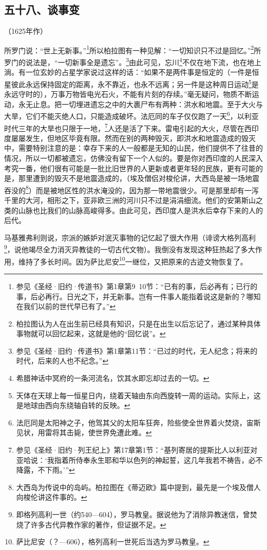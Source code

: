 \subsection*{五十八、谈事变}


\begin{center}
    （1625年作）
\end{center}

\par 所罗门说：“世上无新事。”\footnote{参见《圣经·旧约·传道书》第1章第9~10节：“已有的事，后必再有；已行的事，后必再行。日光之下，并无新事。岂有一件事人能指着说这是新的？哪知在我们以前的世代早已有了。”}所以柏拉图有一种见解：“一切知识只不过是回忆。”\footnote{柏拉图认为人在出生前已经具有知识，只是在出生以后忘记了，通过某种具体事物就可以回忆起来，这就是他的“回忆说”。}所罗门的说法是，“一切新事全是遗忘”。\footnote{参见《圣经·旧约·传道书》第1章第11节：“已过的时代，无人纪念；将来的时代，后来的人也不纪念。”}由此可见，忘川\footnote{希腊神话中冥府的一条河流名，饮其水即忘却过去的一切。}不仅在地下流，也在地上淌。有一位玄妙的占星学家说过这样的话：“如果不是两件事是恒定的（一件是恒星彼此永远保持固定的距离，永不靠近，也永不远离；另一件是这种周日运动\footnote{天体在天球上每一恒星日内，绕着天轴由东向西旋转一周的运动。实际上，这是地球由西向东绕轴自转的反映。}是永远守时的），万事万物皆电光石火，不能有片刻的存续。”毫无疑问，物质不断运动，永无止息。把一切埋进遗忘之中的大裹尸布有两种：洪水和地震。至于大火与大旱，它们不能灭绝人口，只能造成破坏。法厄同的车子仅仅跑了一天\footnote{法厄同是太阳神之子，他驾其父的太阳车狂奔，险些使全世界着火焚烧，宙斯见状，用雷将其击毙，使世界免遭此难。}，以利亚时代三年的大旱也只限于一地，\footnote{参见《圣经·旧约·列王纪上》第17章第1节：“基列寄居的提斯比人以利亚对亚哈说：‘我指着所侍奉永生耶和华以色列的神起誓，这几年我若不祷告，必不降露，不下雨。’”}人还是活了下来。雷电引起的大火，尽管在西印度屡屡发生，但地区毕竟有限。然而在别的两种毁灭，即洪水和地震造成的毁灭中，需要特别注意的是：幸存下来的人一般都是无知的山民，他们提供不了往昔的情况，所以一切都被遗忘，仿佛没有留下一个人似的。要是你对西印度的人民深入考究一番，他们很有可能是一批比旧世界的人更新或者更年轻的民族，更有可能的是，那里遭到的毁灭不是地震造成的，（埃及僧侣对梭伦讲，大西岛是被一场地震吞没的\footnote{大西岛为传说中的岛屿。柏拉图在《蒂迈欧》篇中提到，最先是一个埃及僧人向梭伦讲这件事的。}）而是被地区性的洪水淹没的，因为那一带地震很少。可是那里却有一泻千里的大河，相形之下，亚非欧三洲的河川只不过是涓涓细流。他们的安第斯山之类的山脉也比我们的山脉高峻得多。由此可见，西印度人是洪水后幸存下来的人的后代。
\par 马基雅弗利则说，宗派的嫉妒对泯灭事物的记忆起了很大作用（诽谤大格列高利\footnote{即格列高利一世（约540—604），罗马教皇。据说他为了消除异教迷信，曾焚烧了许多古代异教作家的著作，但证据不足。}，说他竭尽全力消灭异教徒的一切古代文物）。我倒没有发现这种狂热起了多大作用，维持了多长时间。因为萨比尼安\footnote{萨比尼安（？—606），格列高利一世死后当选为罗马教皇。}一继位，又把原来的古迹文物恢复了。
